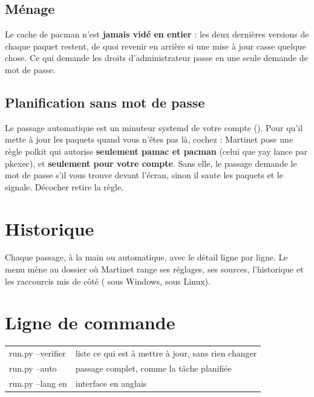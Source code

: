 \subsection{Ménage}


Le cache de pacman n'est \textbf{jamais vidé en entier} : les deux dernières versions de chaque paquet
restent, de quoi revenir en arrière si une mise à jour casse quelque chose. Ce qui demande les droits
d'administrateur passe en une seule demande de mot de passe.

\subsection{Planification sans mot de passe}


Le passage automatique est un minuteur systemd de votre compte ().
Pour qu'il mette à jour les paquets quand vous n'êtes pas là, cochez  : Martinet pose une règle polkit qui autorise \textbf{seulement pamac et pacman}
(celui que yay lance par pkexec), et \textbf{seulement pour votre compte}. Sans elle, le passage demande le mot de passe s'il vous trouve
devant l'écran, sinon il saute les paquets et le signale. Décocher retire la règle.

\section{Historique}


Chaque passage, à la main ou automatique, avec le détail ligne par ligne. Le menu
 mène au dossier où Martinet range ses réglages, ses
sources, l'historique et les raccourcis mis de côté ( sous Windows,  sous Linux).

\section{Ligne de commande}

\begin{center}
\begin{tabular}{>{\ttfamily}l l}
\toprule
run.py --verifier & liste ce qui est à mettre à jour, sans rien changer \\
run.py --auto & passage complet, comme la tâche planifiée \\
run.py --lang en & interface en anglais \\
\bottomrule
\end{tabular}
\end{center}

